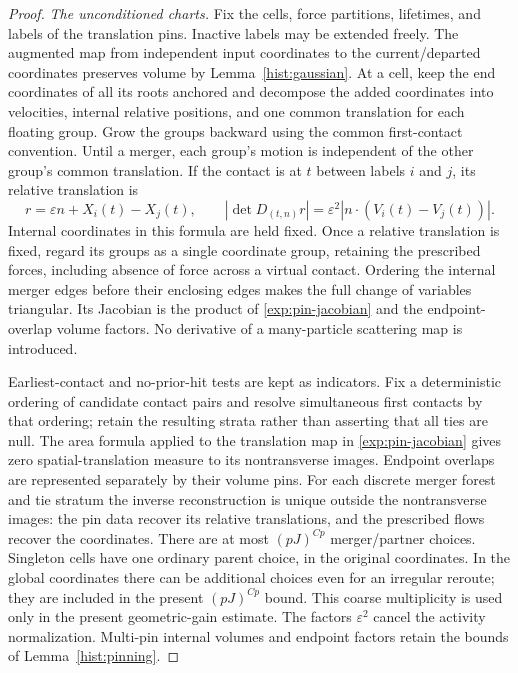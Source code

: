 \begin{proof}
\emph{The unconditioned charts.}
Fix the cells, force partitions, lifetimes, and labels of the translation
pins.  Inactive labels may be extended freely.  The augmented map from
independent input coordinates to the current/departed coordinates preserves
volume by Lemma~\ref{hist:gaussian}.  At a cell, keep the end coordinates of
all its roots anchored and decompose the added coordinates into velocities,
internal relative positions, and one common translation for each floating
group.  Grow the groups backward using the common first-contact convention.
Until a merger, each group's motion is independent of the other group's
common translation.  If the contact is at $t$ between labels $i$ and $j$,
its relative translation is
\begin{equation}
\label{exp:pin-jacobian}
 r=\varepsilon n+X_i(t)-X_j(t),\qquad
 |\det D_{(t,n)}r|
 =\varepsilon^2|n\cdot(V_i(t)-V_j(t))|.
\end{equation}
Internal coordinates in this formula are held fixed.  Once a relative
translation is fixed, regard its groups as a single coordinate group,
retaining the prescribed forces, including absence of force across a
virtual contact.  Ordering the internal merger edges before their enclosing
edges makes the full change of variables triangular.  Its Jacobian is the
product of \eqref{exp:pin-jacobian} and the endpoint-overlap volume factors.
No derivative of a many-particle scattering map is introduced.

Earliest-contact and no-prior-hit tests are kept as indicators.  Fix a
deterministic ordering of candidate contact pairs and resolve simultaneous
first contacts by that ordering; retain the resulting strata rather than
asserting that all ties are null.  The area formula applied to the
translation map in \eqref{exp:pin-jacobian} gives zero spatial-translation
measure to its nontransverse images.  Endpoint overlaps are represented
separately by their volume pins.  For each discrete merger forest and tie
stratum the inverse reconstruction is unique outside the nontransverse
images: the pin data recover its relative translations, and the prescribed
flows recover the coordinates.  There are at most $(pJ)^{Cp}$
merger/partner choices.  Singleton cells have one ordinary parent choice,
in the original coordinates.  In the global coordinates there can be
additional choices even for an irregular reroute; they are included in
the present $(pJ)^{Cp}$ bound.  This coarse multiplicity is used only in the present
geometric-gain estimate.  The factors $\varepsilon^2$ cancel the activity
normalization.  Multi-pin internal volumes and endpoint factors retain the
bounds of Lemma~\ref{hist:pinning}.


\end{proof}

